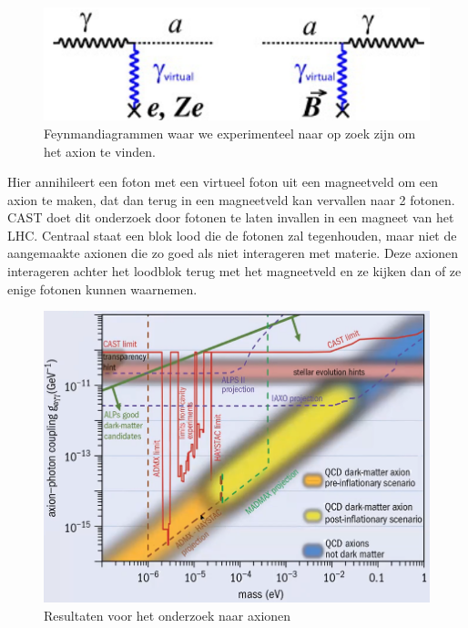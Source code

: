 \documentclass[../main.tex]{subfiles}
\begin{document}
\begin{figure}[h]
    \centering
    \includegraphics[width=0.4\linewidth]{physics_beyond_the_standard_model/axion_diagrammen.png}
    \caption{Feynmandiagrammen waar we experimenteel naar op zoek zijn om het axion te vinden.}%
    \label{fig:physics_beyond_the_standard_model/axion_diagrammen}
\end{figure}

Hier annihileert een foton met een virtueel foton uit een magneetveld om een axion te maken, dat dan terug in een magneetveld kan vervallen naar 2 fotonen. CAST doet dit onderzoek door fotonen te laten invallen in een magneet van het LHC. Centraal staat een blok lood die de fotonen zal tegenhouden, maar niet de aangemaakte axionen die zo goed als niet interageren met materie. Deze axionen interageren achter het loodblok terug met het magneetveld en ze kijken dan of ze enige fotonen kunnen waarnemen.

\begin{figure}[h]
    \centering
    \includegraphics[width=0.6\linewidth]{physics_beyond_the_standard_model/cast_resultaten.png}
    \caption{Resultaten voor het onderzoek naar axionen}%
    \label{fig:physics_beyond_the_standard_model/cast_resultaten}
\end{figure}
\end{document}
